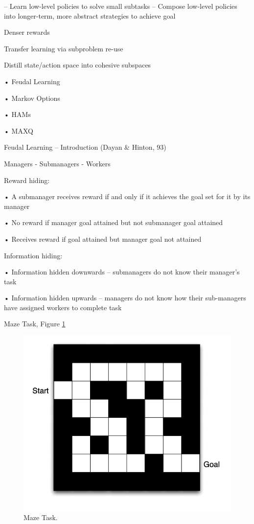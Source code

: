 \documentclass[english]{article}
\begin{document}
– Learn low-level policies to solve small subtasks
– Compose low-level policies into longer-term, more abstract
strategies to achieve goal
\benum 
\item  Denser rewards
\item  Transfer learning via subproblem re-use
\item  Distill state/action space into cohesive subspaces

\eenum

\item  
• Feudal Learning

• Markov Options

• HAMs

• MAXQ

\item Feudal Learning – Introduction   (Dayan \& Hinton, 93)

Managers - Submanagers - Workers

\benum 
\item  
Reward hiding: 

•  A submanager receives reward
if and only if it achieves the
goal set for it by its manager

• No reward if manager goal
attained but not submanager
goal attained

• Receives reward if goal
attained but manager goal not
attained

\item  
Information hiding: 

• Information hidden
downwards – submanagers do
not know their manager’s task

• Information hidden upwards –
managers do not know how
their sub-managers have
assigned workers to complete
task

\item  Maze Task, Figure \ref{maze10}

  \begin{figure}
        \centering
        \includegraphics[scale = 0.35]{maze.PNG}
        
        \caption{Maze Task.}
        \label{maze10}
    \end{figure}
\end{document}
